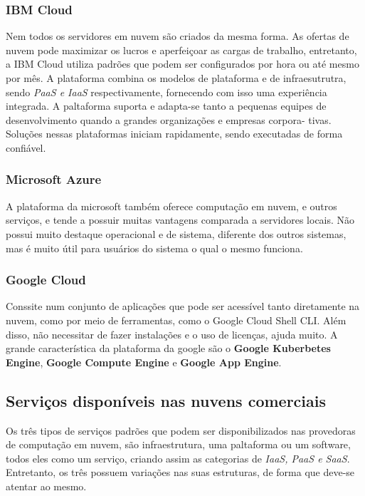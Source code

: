 \documentclass[12pt, a4paper]{paper}
\begin{document}
  \subsubsection{IBM Cloud} %
  \label{sec:IBM Cloud}
  Nem todos os servidores em nuvem são criados da mesma forma. As ofertas de nuvem
  pode maximizar os lucros e aperfeiçoar as cargas de trabalho, entretanto, a 
  IBM Cloud utiliza padrões que podem ser configurados por hora ou até mesmo por mês.
  A plataforma combina os modelos de plataforma e de infraesutrutra, sendo 
  \textit{PaaS e IaaS} respectivamente, fornecendo com isso uma experiência integrada.
  A paltaforma suporta e adapta-se tanto a pequenas equipes de desenvolvimento quando 
  a grandes organizações e empresas corpora- 
  tivas. Soluções nessas plataformas iniciam rapidamente, sendo executadas de forma 
  confiável.

  \subsubsection{Microsoft Azure} %
  \label{sec:Microsoft Azure}
  A plataforma da microsoft também oferece computação em nuvem, e outros serviços, e 
  tende a possuir muitas vantagens comparada a servidores locais. Não possui muito 
  destaque operacional e de sistema, diferente dos outros sistemas, mas é muito 
  útil para usuários do sistema o qual o mesmo funciona.

  \subsubsection{Google Cloud} %
  \label{sec:Google Cloud}
  Conssite num conjunto de aplicações que pode ser acessível tanto diretamente na 
  nuvem, como por meio de ferramentas, como o Google Cloud Shell CLI. Além disso, 
  não necessitar de fazer instalações e o uso de licenças, ajuda muito. A grande 
  característica da plataforma da google são o \textbf{Google Kuberbetes Engine}, 
  \textbf{Google Compute Engine} e \textbf{Google App Engine}.

\subsection{Serviços disponíveis nas nuvens comerciais} %
\label{sub:Serviços disponíveis nas nuvens comerciais}
Os três tipos de serviços padrões que podem ser disponibilizados nas provedoras de 
computação em nuvem, são infraestrutura, uma paltaforma ou um software, todos eles 
como um serviço, criando assim as categorias de \textit{IaaS, PaaS e SaaS}. Entretanto, 
os três possuem variações nas suas estruturas, de forma que deve-se atentar ao mesmo. 
\end{document}
